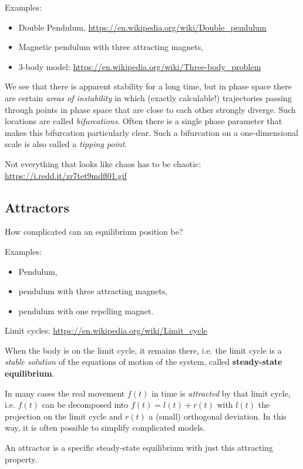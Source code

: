 \documentclass[11pt,a4paper]{article}
\begin{document}
Examples: 
\begin{itemize}
\item Double Pendulum, \url{https://en.wikipedia.org/wiki/Double_pendulum}
\item Magnetic pendulum with three attracting magnets,
\item 3-body model: \url{https://en.wikipedia.org/wiki/Three-body_problem}
\end{itemize}

We see that there is apparent stability for a long time, but in phase space
there are certain \emph{areas of instability} in which (exactly calculable!)
trajectories passing through points in phase space that are close to each
other strongly diverge. Such locations are called \emph{bifurcations}.  Often
there is a single phase parameter that makes this bifurcation particularly
clear. Such a bifurcation on a one-dimensional scale is also called a
\emph{tipping point}.

Not everything that looks like chaos has to be chaotic:\\
\url{https://i.redd.it/zr7tet9mdfl01.gif}

\subsection{Attractors}

How complicated can an equilibrium position be? 

Examples: 
\begin{itemize}
\item Pendulum,
\item pendulum with three attracting magnets,
\item pendulum with one repelling magnet.
\end{itemize}

Limit cycles: \url{https://en.wikipedia.org/wiki/Limit_cycle}

When the body is on the limit cycle, it remains there, i.e. the limit cycle is
a \emph{stable solution} of the equations of motion of the system, called
\textbf{steady-state equilibrium}.
    
In many cases the real movement $f(t)$ in time is \emph{attracted} by that
limit cycle, i.e. $f(t)$ can be decomposed into $f(t)=l(t)+r(t)$ with $l(t)$
the projection on the limit cycle and $r(t)$ a (small) orthogonal deviation.
In this way, it is often possible to simplify complicated models.

An attractor is a specific steady-state equilibrium with just this attracting
property.
\end{document}
